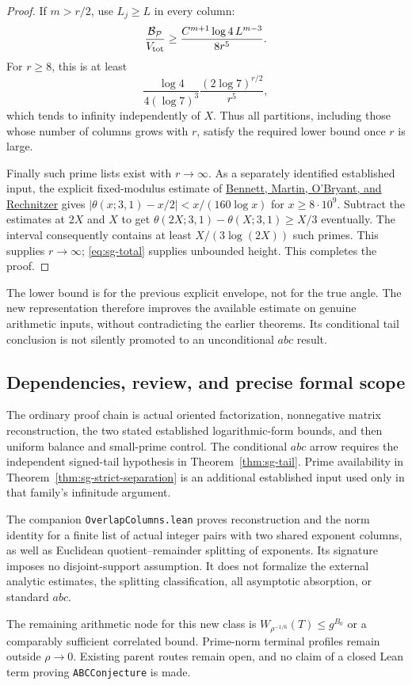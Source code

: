 \begin{proof}
If $m>r/2$, use $L_j\ge L$ in every column:
\[
 \frac{\mathcal B_{\mathcal P}}{V_{\rm tot}}
 \ge\frac{C^{m+1}\log4\,L^{m-3}}{8r^5}.
\]
For $r\ge8$, this is at least
\[
 \frac{\log4}{4(\log7)^3}\frac{(2\log7)^{r/2}}{r^5},
\]
which tends to infinity independently of $X$. Thus all partitions, including
those whose number of columns grows with $r$, satisfy the required lower bound
once $r$ is large.

Finally such prime lists exist with $r\to\infty$. As a separately identified
established input, the explicit fixed-modulus estimate of
\href{https://arxiv.org/abs/1802.00085v3}{Bennett, Martin, O'Bryant, and Rechnitzer}
gives $|\theta(x;3,1)-x/2|<x/(160\log x)$ for $x\ge8\cdot10^9$.
Subtract the estimates at $2X$ and $X$ to get
$\theta(2X;3,1)-\theta(X;3,1)\ge X/3$ eventually. The interval consequently
contains at least $X/(3\log(2X))$ such primes. This supplies $r\to\infty$;
\eqref{eq:sg-total} supplies unbounded height. This completes the proof.
\end{proof}

The lower bound is for the previous explicit envelope, not for the true angle.
The new representation therefore improves the available estimate on genuine
arithmetic inputs, without contradicting the earlier theorems. Its conditional
tail conclusion is not silently promoted to an unconditional $abc$ result.

\subsection{Dependencies, review, and precise formal scope}
The ordinary proof chain is actual oriented factorization, nonnegative matrix
reconstruction, the two stated established logarithmic-form bounds, and then
uniform balance and small-prime control. The conditional $abc$ arrow requires
the independent signed-tail hypothesis in Theorem~\ref{thm:sg-tail}.
Prime availability in Theorem~\ref{thm:sg-strict-separation} is an additional
established input used only in that family's infinitude argument.

The companion \texttt{OverlapColumns.lean} proves reconstruction and the norm
identity for a finite list of actual integer pairs with two shared exponent
columns, as well as Euclidean quotient--remainder splitting of exponents. Its
signature imposes no disjoint-support assumption. It does not formalize the
external analytic estimates, the splitting classification, all asymptotic
absorption, or standard $abc$.

The remaining arithmetic node for this new class is
$W_{\rho^{-1/6}}(T)\le g^{B_0}$ or a comparably sufficient correlated bound.
Prime-norm terminal profiles remain outside $\rho\to0$. Existing parent
routes remain open, and no claim of a closed Lean term proving
\texttt{ABCConjecture} is made.
